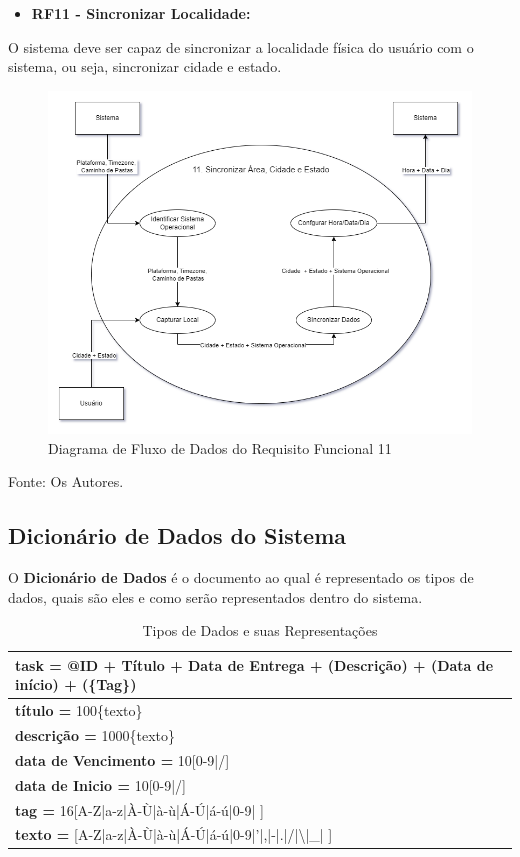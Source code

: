 \documentclass[a4paper,12pt]{article}
\begin{document}
\pagebreak
\begin{itemize}
\item\textbf{RF11 - Sincronizar Localidade:}
\end{itemize}

O sistema deve ser capaz de sincronizar a localidade física do usuário com o sistema, ou seja, sincronizar cidade e estado.
\begin{figure}[H]
	\centering
	\includegraphics[scale=0.45]{DFDs/RF11.drawio.png}
	\caption{Diagrama de Fluxo de Dados do Requisito Funcional 11}
\end{figure}
\noindent Fonte: Os Autores.

\subsection{Dicionário de Dados do Sistema}
O \textbf{Dicionário de Dados} é o documento ao qual é representado os tipos de dados, quais são eles e como serão 
representados dentro do sistema.
\begin{table}[H]
	\noindent
	\begin{tabular}{|l|}
		\hline
			\textbf{task =} @ID + Título + Data de Entrega + (Descrição) + (Data de início) + (\{Tag\})\\ \hline
			\textbf{título =} 100\{texto\} \\ \hline
			\textbf{descrição =} 1000\{texto\} \\ \hline
			\textbf{data de Vencimento =} 10[0-9|/] \\ \hline
			\textbf{data de Inicio =} 10[0-9|/] \\ \hline
			\textbf{tag =} 16[A-Z|a-z|À-Ù|à-ù|Á-Ú|á-ú|0-9| ] \\ \hline
			\textbf{texto =} [A-Z|a-z|À-Ù|à-ù|Á-Ú|á-ú|0-9|'|,|-|.|/|\textbackslash|\_| ] \\ \hline
	\end{tabular}
	\caption{Tipos de Dados e suas Representações}
\end{table}
\end{document}
